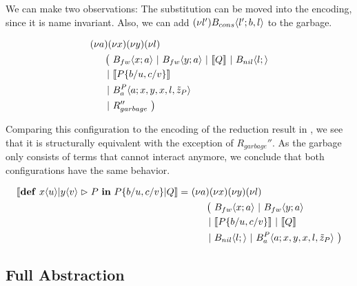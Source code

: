 We can make two observations:
The substitution can be moved into the encoding, since it is name invariant.
Also, we can add $\anew{l'}{\ains{B_{cons}}{l'}{b,l}}$ to the garbage.

\begin{align*}
  &\anew{a}{\anew{x}{\anew{y}{\anew{l}{ \\
    &\hspace{0.5cm}
    \begin{aligned}[t]
      \big(\ &\ains{B_{fw}}{x}{a}
      \apar   \ains{B_{fw}}{y}{a}
      \apar   \encMJtoAP{Q}
      \apar   \ains{B_{nil}}{l}{}
      \\
      \apar  &\encMJtoAP{P\substitution{\subst{b}{u},\subst{c}{v}}}
      \\
      \apar  &\ains{B_a^P}{a}{x, y, x, l,\tilde{z}_P}
      \\
      \apar  &R_{garbage}''
      \ \big)
    \end{aligned}
  }}}}
\end{align*}

Comparing this configuration to the encoding of the reduction result
in \joincalc,
we see that it is structurally equivalent with the exception of $R_{garbage}''$.
As the garbage only consists of terms that cannot interact anymore,
we conclude that both configurations have the same behavior.

\begin{align*}
  \encMJtoAP{\jdef{\jrct{\jrcv{x}{u} \jpat \jrcv{y}{v}}{P}}{P\substitution{\subst{b}{u},\subst{c}{v}} \jpar Q}}
  =\ &\anew{a}{\anew{x}{\anew{y}{\anew{l}{ \\
      &\hspace{0.5cm}
      \begin{aligned}[t]
        \big(\ &\ains{B_{fw}}{x}{a}
        \apar   \ains{B_{fw}}{y}{a} \\
        \apar  &\encMJtoAP{P\substitution{\subst{b}{u},\subst{c}{v}}} \apar \encMJtoAP{Q} \\
        \apar  &\ains{B_{nil}}{l}{}
        \apar   \ains{B_a^P}{a}{x, y, x, l, \tilde{z}_P}
        \ \big)
      \end{aligned}
    }}}}
\end{align*}



\subsection{Full Abstraction}

